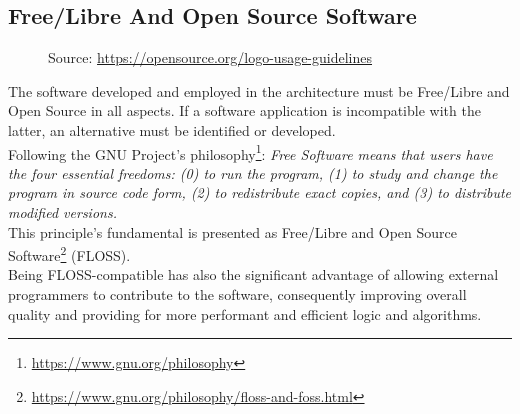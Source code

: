 \subsection{Free/Libre And Open Source Software}
\label{subsec:introduction_principles_free_libre_and_open_source_software}

\begin{figure} %
  \centering
  \def\stackalignment{l} %
  {\scriptsize \parbox[t]{\linewidth}{ Source: \url{https://opensource.org/logo-usage-guidelines}} }
\end{figure}

The software developed and employed in the architecture must be Free/Libre and Open
Source in all aspects. If a software application is incompatible with the latter,
an alternative must be identified or developed. \\ %
Following the GNU Project's philosophy\footnote{\url{https://www.gnu.org/philosophy}}:
\textit{Free Software means that users have the four essential freedoms: (0) to run
the program, (1) to study and change the program in source code form, (2) to redistribute
exact copies, and (3) to distribute modified versions.} \\ %
This principle's fundamental is presented as Free/Libre and Open Source Software\footnote{\url{https://www.gnu.org/philosophy/floss-and-foss.html}}
(FLOSS). \\ %
Being FLOSS-compatible has also the significant advantage of allowing external programmers
to contribute to the software, consequently improving overall quality and
providing for more performant and efficient logic and algorithms.

